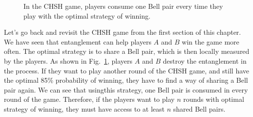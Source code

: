 \begin{figure}[t]
   \centering
    
    \caption[CHSH game consumes entanglement.]{In the CHSH game, players consume one Bell pair every time they play with the optimal strategy of winning.}
    \label{fig:chsh-broken}
\end{figure}


Let's go back and revisit the CHSH game from the first section of this chapter.
We have seen that entanglement can help players $A$ and $B$ win the game more often.
The optimal strategy is to share a Bell pair, which is then locally measured by the players.
As shown in Fig.~\ref{fig:chsh-broken}, players $A$ and $B$ destroy the entanglement in the process.
If they want to play another round of the CHSH game, and still have the optimal 85\% probability of winning, they have to find a way of sharing a Bell pair again.
We can see that usingthis strategy, one Bell pair is consumed in every round of the game.
Therefore, if the players want to play $n$ rounds with optimal strategy of winning, they must have access to at least $n$ shared Bell pairs.

